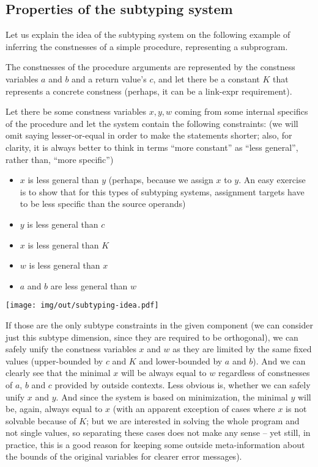 \subsection{Properties of the subtyping system}
\label{subtyping-idea}

Let us explain the idea of the subtyping system on the following example of inferring the constnesses of a simple procedure, representing a subprogram.

The constnesses of the procedure arguments are represented by the constness variables $a$ and $b$ and a return value's $c$, and let there be a constant $K$ that represents a concrete constness (perhaps, it can be a link-expr requirement).

Let there be some constness variables $x, y, w$ coming from some internal specifics of the procedure and let the system contain the following constraints: (we will omit saying lesser-or-equal in order to make the statements shorter; also, for clarity, it is always better to think in terms ``more constant'' as ``less general'', rather than, ``more specific'')

\begin{itemize}
    \item $x$ is less general than $y$ (perhaps, because we assign $x$ to $y$. An easy exercise is to show that for this types of subtyping systems, assignment targets have to be less specific than the source operands)
    \item $y$ is less general than $c$
    \item $x$ is less general than $K$
    \item $w$ is less general than $x$
    \item $a$ and $b$ are less general than $w$
\end{itemize}

\centerline{\texttt{[image: img/out/subtyping-idea.pdf]}}

If those are the only subtype constraints in the given component (we can consider just this subtype dimension, since they are required to be orthogonal), we can safely unify the constness variables $x$ and $w$ as they are limited by the same fixed values (upper-bounded by $c$ and $K$ and lower-bounded by $a$ and $b$). And we can clearly see that the minimal $x$ will be always equal to $w$ regardless of constnesses of $a$, $b$ and $c$ provided by outside contexts. Less obvious is, whether we can safely unify $x$ and $y$. And since the system is based on minimization, the minimal $y$ will be, again, always equal to $x$ (with an apparent exception of cases where $x$ is not solvable because of $K$; but we are interested in solving the whole program and not single values, so separating these cases does not make any sense -- yet still, in practice, this is a good reason for keeping some outside meta-information about the bounds of the original variables for clearer error messages).

